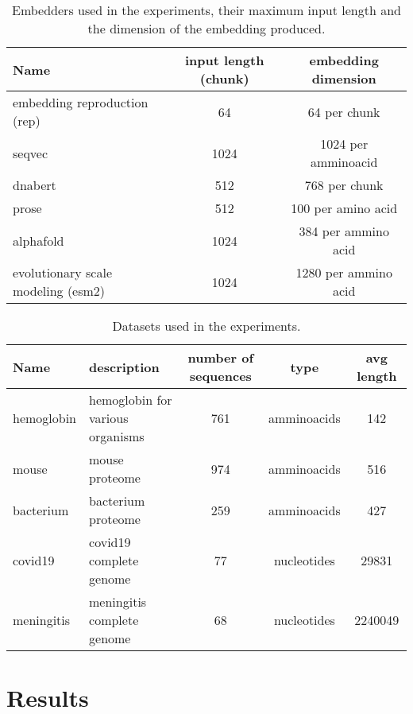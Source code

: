 \documentclass[12pt, letterpaper, twocolumn]{article}
\begin{document}
\begin{table*}[htb]
\centering
\begin{tabular}{|l c c|} 
    \hline
    Name & input length (chunk) & embedding dimension  \\ 
    \hline
    embedding reproduction (rep)\cite{yang2018learned}       & 64    & 64 per chunk   \\
    seqvec \cite{heinzinger2019modeling} & 1024 & 1024 per amminoacid \\
    dnabert \cite{ji2021dnabert}                     & 512     & 768 per chunk \\
    prose   \cite{bepler2021learning}                   & 512   & 100 per amino acid   \\
    alphafold  \cite{jumper2021highly}                 & 1024   & 384 per ammino acid\\
    evolutionary scale modeling (esm2) \cite{lin2023evolutionary}   & 1024    & 1280 per ammino acid \\  
    \hline
\end{tabular}
\caption{Embedders used in the experiments, their maximum input length and the dimension of the embedding produced.}
\label{tab:embedders}
\end{table*}




\begin{table*}[htb]
\centering
\begin{tabular}{|p{3cm} p{3cm} c c c |} 
    \hline
    Name & description & number of sequences & type & avg length   \\ 
    \hline
    hemoglobin &  hemoglobin for various organisms & 761 & amminoacids & 142  \\
    \hline
    mouse & mouse proteome     & 974 & amminoacids & 516 \\
    \hline
    bacterium & bacterium proteome  & 259 &  amminoacids & 427  \\
    \hline
    covid19 & covid19 complete genome & 77 & nucleotides & 29831  \\
    \hline
    meningitis & meningitis complete genome & 68 & nucleotides & 2240049 \\
    \hline
\end{tabular}
\caption{Datasets used in the experiments.}
\label{tab:dataset}
\end{table*}





\section{Results}
\end{document}
